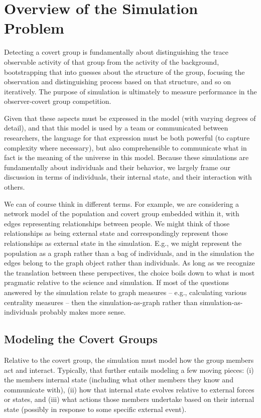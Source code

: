 \documentclass{article}
\begin{document}
\section*{Overview of the Simulation Problem}
Detecting a covert group is fundamentally about distinguishing the trace observable activity of that group from the activity of the background, bootstrapping that into guesses about the structure of the group, focusing the observation and distinguishing process based on that structure, and so on iteratively.  The purpose of simulation is ultimately to measure performance in the observer-covert group competition.

Given that these aspects must be expressed in the model (with varying degrees of detail), and that this model is used by a team or communicated between researchers, the language for that expression must be both powerful (to capture complexity where necessary), but also comprehensible to communicate what in fact is the meaning of the universe in this model.  Because these simulations are fundamentally about individuals and their behavior, we largely frame our discussion in terms of individuals, their internal state, and their interaction with others.

We can of course think in different terms.  For example, we are considering a network model of the population and covert group embedded within it, with edges representing relationships between people.  We might think of those relationships as being external state and correspondingly represent those relationships as external state in the simulation.  E.g., we might represent the population as a graph rather than a bag of individuals, and in the simulation the edges belong to the graph object rather than individuals.  As long as we recognize the translation between these perspectives, the choice boils down to what is most pragmatic relative to the science and simulation.  If most of the questions answered by the simulation relate to graph measures -- e.g., calculating various centrality measures -- then the simulation-as-graph rather than simulation-as-individuals probably makes more sense.

\subsection*{Modeling the Covert Groups}
Relative to the covert group, the simulation must model how the group members act and interact.  Typically, that further entails modeling a few moving pieces: (i) the members internal state (including what other members they know and communicate with), (ii) how that internal state evolves relative to external forces or states, and (iii) what actions those members undertake based on their internal state (possibly in response to some specific external event).
\end{document}
